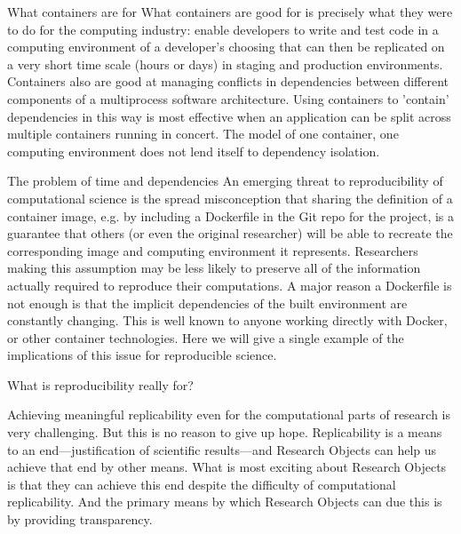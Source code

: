 			What containers are for
				What containers are good for is precisely what they were to do for the computing industry:  enable developers to write and test code in a
					computing environment of a developer's choosing that can then be replicated on a very short time scale (hours or days) in staging
					and production environments.
				Containers also are good at managing conflicts in dependencies between different components of a multiprocess software architecture.
				Using containers to 'contain' dependencies in this way is most effective when an application can be split across multiple containers running in concert.
				The model of one container, one computing environment does not lend itself to dependency isolation.

			The problem of time and dependencies
				An emerging threat to reproducibility of computational science is the spread misconception that sharing the definition of a container image,
					e.g. by including a Dockerfile in the Git repo for the project, is a guarantee that others (or even the original researcher) will be able to
					recreate the corresponding image and computing environment it represents.
				Researchers making this assumption may be less likely to preserve all of the information actually required to reproduce their computations.
				A major reason a Dockerfile is not enough is that the implicit dependencies of the built environment are constantly changing.
				This is well known to anyone working directly with Docker, or other container technologies.
				Here we will give a single example of the implications of this issue for reproducible science.

	What is reproducibility really for?

		Achieving meaningful replicability even for the computational parts of research is very challenging.
		But this is no reason to give up hope.
		Replicability is a means to an end---justification of scientific results---and Research Objects can help us achieve that end by other means.
		What is most exciting about Research Objects is that they can achieve this end despite the difficulty of computational replicability.
		And the primary means by which Research Objects can due this is by providing transparency.



